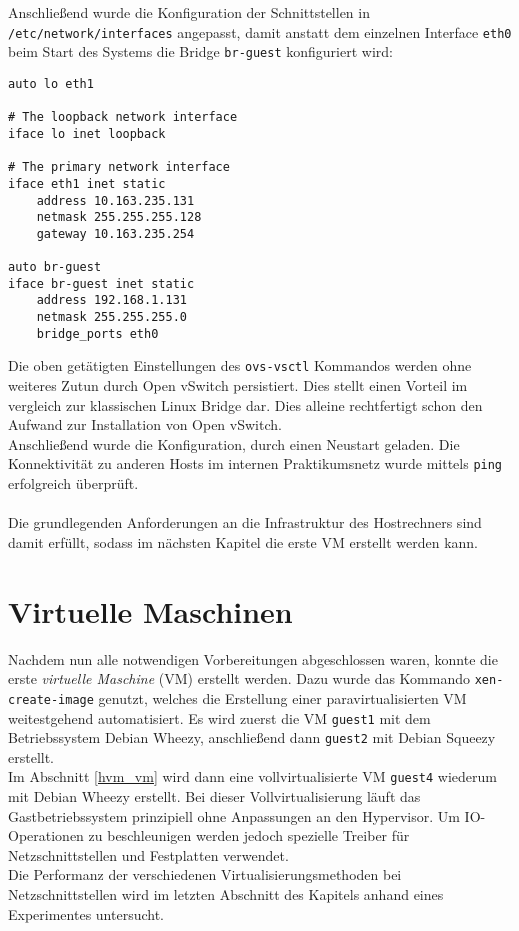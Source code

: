 Anschließend wurde die Konfiguration der Schnittstellen in \verb#/etc/network/interfaces# angepasst, damit anstatt dem einzelnen Interface \verb#eth0# beim Start des Systems die Bridge \verb#br-guest# konfiguriert wird:
\setupVerbatimOut
\begin{verbatim}
auto lo eth1

# The loopback network interface
iface lo inet loopback

# The primary network interface
iface eth1 inet static
    address 10.163.235.131
    netmask 255.255.255.128
    gateway 10.163.235.254

auto br-guest
iface br-guest inet static
    address 192.168.1.131
    netmask 255.255.255.0
    bridge_ports eth0
\end{verbatim}

Die oben getätigten Einstellungen des \verb#ovs-vsctl# Kommandos werden ohne weiteres Zutun durch Open vSwitch persistiert. Dies stellt einen Vorteil im vergleich zur klassischen Linux Bridge dar. Dies alleine rechtfertigt schon den Aufwand zur Installation von Open vSwitch. 
\\
Anschließend wurde die Konfiguration, durch einen Neustart geladen. Die Konnektivität zu anderen Hosts im internen Praktikumsnetz wurde mittels \verb#ping# erfolgreich überprüft.
\\
\\
Die grundlegenden Anforderungen an die Infrastruktur des Hostrechners sind damit erfüllt, sodass im nächsten Kapitel die erste VM erstellt werden kann.

\chapter{Virtuelle Maschinen}
Nachdem nun alle notwendigen Vorbereitungen abgeschlossen waren, konnte die erste \emph{virtuelle Maschine} (VM) erstellt werden. Dazu wurde das Kommando \verb#xen-create-image# genutzt, welches die Erstellung einer paravirtualisierten VM weitestgehend automatisiert. Es wird zuerst die VM \verb#guest1# mit dem Betriebssystem Debian Wheezy, anschließend dann \verb#guest2# mit Debian Squeezy erstellt.
\\
Im Abschnitt \ref{hvm_vm} wird dann eine vollvirtualisierte VM \verb#guest4# wiederum mit Debian Wheezy erstellt. Bei dieser Vollvirtualisierung läuft das Gastbetriebssystem prinzipiell ohne Anpassungen an den Hypervisor. Um IO-Operationen zu beschleunigen werden jedoch spezielle Treiber für Netzschnittstellen und Festplatten verwendet. 
\\
Die Performanz der verschiedenen Virtualisierungsmethoden bei Netzschnittstellen wird im letzten Abschnitt des Kapitels anhand eines Experimentes untersucht.

